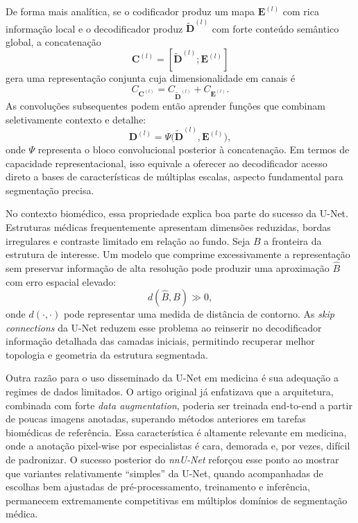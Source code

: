 \documentclass[tcc,capa]{texufpel}
\begin{document}
De forma mais analítica, se o codificador produz um mapa \(\mathbf{E}^{(l)}\) com rica informação local e o decodificador produz \(\tilde{\mathbf{D}}^{(l)}\) com forte conteúdo semântico global, a concatenação
\begin{equation}
	\mathbf{C}^{(l)} = [\tilde{\mathbf{D}}^{(l)};\mathbf{E}^{(l)}]
\end{equation}
gera uma representação conjunta cuja dimensionalidade em canais é
\begin{equation}
	C_{\mathbf{C}^{(l)}} = C_{\tilde{\mathbf{D}}^{(l)}} + C_{\mathbf{E}^{(l)}}.
\end{equation}
As convoluções subsequentes podem então aprender funções que combinam seletivamente contexto e detalhe:
\begin{equation}
	\mathbf{D}^{(l)} = \Psi\big(\tilde{\mathbf{D}}^{(l)}, \mathbf{E}^{(l)}\big),
\end{equation}
onde \(\Psi\) representa o bloco convolucional posterior à concatenação. Em termos de capacidade representacional, isso equivale a oferecer ao decodificador acesso direto a bases de características de múltiplas escalas, aspecto fundamental para segmentação precisa.

No contexto biomédico, essa propriedade explica boa parte do sucesso da U-Net. Estruturas médicas frequentemente apresentam dimensões reduzidas, bordas irregulares e contraste limitado em relação ao fundo. Seja \(B\) a fronteira da estrutura de interesse. Um modelo que comprime excessivamente a representação sem preservar informação de alta resolução pode produzir uma aproximação \(\hat{B}\) com erro espacial elevado:
\begin{equation}
	d(\hat{B}, B) \gg 0,
\end{equation}
onde \(d(\cdot,\cdot)\) pode representar uma medida de distância de contorno. As \textit{skip connections} da U-Net reduzem esse problema ao reinserir no decodificador informação detalhada das camadas iniciais, permitindo recuperar melhor topologia e geometria da estrutura segmentada. 

Outra razão para o uso disseminado da U-Net em medicina é sua adequação a regimes de dados limitados. O artigo original já enfatizava que a arquitetura, combinada com forte \textit{data augmentation}, poderia ser treinada end-to-end a partir de poucas imagens anotadas, superando métodos anteriores em tarefas biomédicas de referência. Essa característica é altamente relevante em medicina, onde a anotação pixel-wise por especialistas é cara, demorada e, por vezes, difícil de padronizar. O sucesso posterior do \textit{nnU-Net} reforçou esse ponto ao mostrar que variantes relativamente ``simples'' da U-Net, quando acompanhadas de escolhas bem ajustadas de pré-processamento, treinamento e inferência, permanecem extremamente competitivas em múltiplos domínios de segmentação médica.
\end{document}
